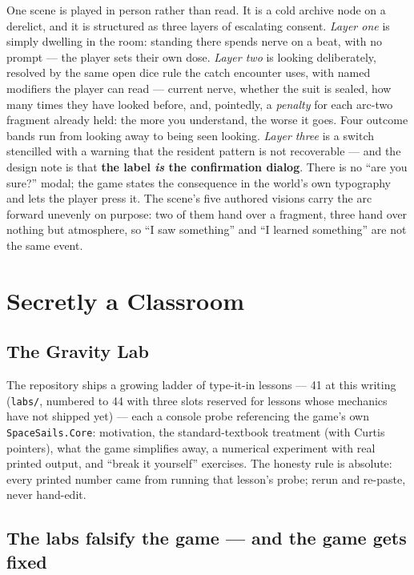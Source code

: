 \documentclass[10pt,twocolumn]{article}
\begin{document}
One scene is played in person rather than read. It is a cold archive node on a derelict, and
it is structured as three layers of escalating consent. \emph{Layer one} is simply dwelling
in the room: standing there spends nerve on a beat, with no prompt --- the player sets their
own dose. \emph{Layer two} is looking deliberately, resolved by the same open dice rule the
catch encounter uses, with named modifiers the player can read --- current nerve, whether the
suit is sealed, how many times they have looked before, and, pointedly, a \emph{penalty} for
each arc-two fragment already held: the more you understand, the worse it goes. Four outcome
bands run from looking away to being seen looking. \emph{Layer three} is a switch stencilled
with a warning that the resident pattern is not recoverable --- and the design note is that
\textbf{the label \emph{is} the confirmation dialog}. There is no ``are you sure?'' modal; the
game states the consequence in the world's own typography and lets the player press it. The
scene's five authored visions carry the arc forward unevenly on purpose: two of them hand over
a fragment, three hand over nothing but atmosphere, so ``I saw something'' and ``I learned
something'' are not the same event.

\section{Secretly a Classroom}
\label{sec:classroom}

\subsection{The Gravity Lab}

The repository ships a growing ladder of type-it-in lessons --- 41 at this writing
(\texttt{labs/}, numbered to 44 with three slots reserved for lessons whose mechanics have
not shipped yet) --- each a console probe referencing the game's own
\texttt{SpaceSails.Core}: motivation, the standard-textbook treatment (with Curtis
pointers), what the game simplifies away, a numerical experiment with real printed output,
and ``break it yourself'' exercises. The honesty rule is absolute: every printed number came
from running that lesson's probe; rerun and re-paste, never hand-edit.

\subsection{The labs falsify the game --- and the game gets fixed}
\label{sec:lab8}
\end{document}
